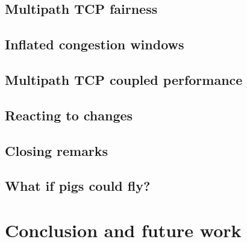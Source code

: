 \documentclass[12pt,a4paper]{article}
\begin{document}
\subsection{Multipath TCP fairness}
\label{sec:results-fairness}

\FloatBarrier
\subsection{Inflated congestion windows}
\label{sec:results-inflated}

\FloatBarrier
\subsection{Multipath TCP coupled performance}
\label{sec:results-performance}

\FloatBarrier
\subsection{Reacting to changes}
\label{sec:results-reacting}

\FloatBarrier
\subsection{Closing remarks}
\label{sec:results-closing-remarks}

\FloatBarrier

\subsection{What if pigs could fly?} %

\section{Conclusion and future work}

\end{document}
